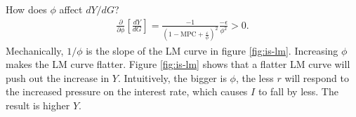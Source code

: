 \documentclass[12pt]{pracjourn_rwr}
\theoremstyle{definition}
\theoremstyle{remark}
\begin{document}
How does $\phi$ affect $d Y / d G$?
\begin{align*}
\frac{\partial}{\partial \phi} \left[ \frac{d Y}{d G} \right] =
\frac{-1}{\left( 1 - \text{MPC} + \frac{\varepsilon}{\phi} \right)^{2}} \frac{-\epsilon}{\phi^{2}} > 0.
\end{align*}
Mechanically, $1 / \phi$ is the slope of the LM curve in figure \ref{fig:is-lm}.
Increasing $\phi$ makes the LM curve flatter.
Figure \ref{fig:is-lm} shows that a flatter LM curve will push out the increase in $Y$.
Intuitively,
the bigger is $\phi$, the less $r$ will respond to the increased pressure on the interest rate,
which causes $I$ to fall by less.
The result is higher $Y$.

% 
% 
\end{document}
